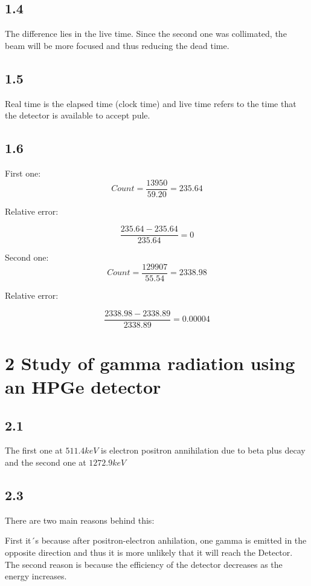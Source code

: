 \documentclass[a4paper,12pt]{article}
\begin{document}
\subsection{1.4}

The difference lies in the live time. Since the second one was collimated, the beam will be more focused and thus reducing the dead time.

\subsection{1.5}

Real time is the elapsed time (clock time) and live time refers to the time that the detector is available to accept pule.

\newpage

\subsection{1.6}
First one:
$$Count = \frac{13950}{59.20} = 235.64 $$	

Relative error: 

$$ \frac{235.64-235.64}{235.64} = 0$$

Second one: 
$$Count = \frac{129907}{55.54} = 2338.98 $$

Relative error: 

$$ \frac{2338.98-2338.89}{2338.89
} = 0.00004$$

\section{2 Study of gamma radiation using an HPGe detector}

\subsection{2.1}

The first one at $511.4 keV$ is electron positron annihilation due to beta plus decay and the second one at $1272.9 keV$

\subsection{2.3}

There are two main reasons behind this: 

First it´s because after positron-electron anhilation, one gamma is emitted in the opposite direction and thus it is more unlikely that it will reach the Detector. 
The second reason is because the efficiency of the detector decreases as the energy increases.
\end{document}
